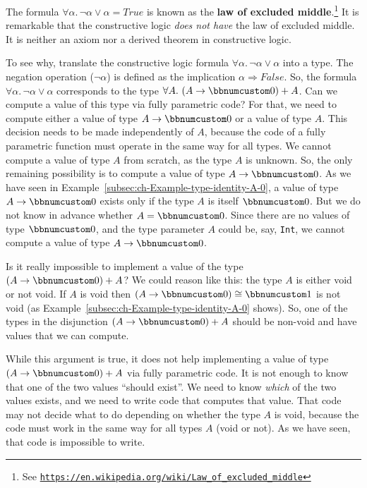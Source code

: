 The formula $\forall\alpha.\,\neg\alpha\vee\alpha=True$ is known
as the \textbf{law of excluded middle}.\footnote{See \texttt{\href{https://en.wikipedia.org/wiki/Law_of_excluded_middle}{https://en.wikipedia.org/wiki/Law\_of\_excluded\_middle}}}
It is remarkable that the constructive logic \emph{does not have}
the law of excluded middle. It is neither an axiom nor a derived theorem
in constructive logic.

To see why, translate the constructive logic formula $\forall\alpha.\,\neg\alpha\vee\alpha$
into a type. The negation operation ($\neg\alpha$) is defined as
the implication $\alpha\Rightarrow False$. So, the formula $\forall\alpha.\,\neg\alpha\vee\alpha$
corresponds to the type $\forall A.\,\left(A\rightarrow\bbnum 0\right)+A$.
Can we compute a value of this type via fully parametric code? For
that, we need to compute either a value of type $A\rightarrow\bbnum 0$
or a value of type $A$. This decision needs to be made independently
of $A$, because the code of a fully parametric function must operate
in the same way for all types. We cannot compute a value of type $A$
from scratch, as the type $A$ is unknown. So, the only remaining
possibility is to compute a value of type $A\rightarrow\bbnum 0$.
As we have seen in Example~\ref{subsec:ch-Example-type-identity-A-0},
a value of type $A\rightarrow\bbnum 0$ exists only if the type $A$
is itself $\bbnum 0$. But we do not know in advance whether $A=\bbnum 0$.
Since there are no values of type $\bbnum 0$, and the type parameter
$A$ could be, say, \lstinline!Int!, we cannot compute a value of
type $A\rightarrow\bbnum 0$. 

Is it really impossible to implement a value of the type $\left(A\rightarrow\bbnum 0\right)+A$?
We could reason like this: the type $A$ is either void or not void.
If $A$ is void then $\left(A\rightarrow\bbnum 0\right)\cong\bbnum 1$
is not void (as Example~\ref{subsec:ch-Example-type-identity-A-0}
shows). So, one of the types in the disjunction $\left(A\rightarrow\bbnum 0\right)+A$
should be non-void and have values that we can compute.

While this argument is true, it does not help implementing a value
of type $\left(A\rightarrow\bbnum 0\right)+A$ via fully parametric
code. It is not enough to know that one of the two values \textsf{``}should
exist\textsf{''}. We need to know \emph{which} of the two values exists, and
we need to write code that computes that value. That code may not
decide what to do depending on whether the type $A$ is void, because
the code must work in the same way for all types $A$ (void or not).
As we have seen, that code is impossible to write.

